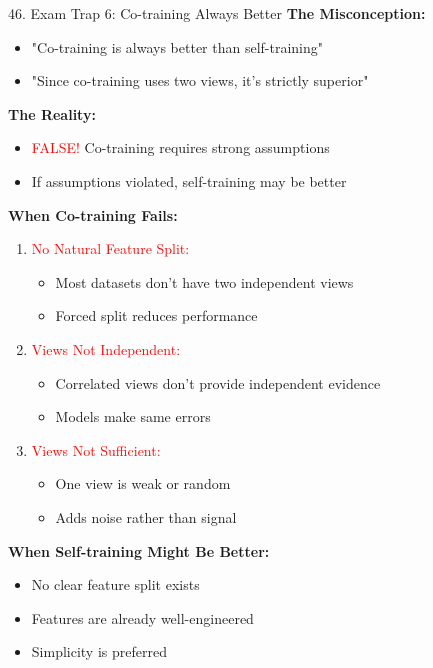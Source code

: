 \documentclass[8pt]{beamer}
\begin{document}
	\begin{frame}{46. Exam Trap 6: Co-training Always Better}
		\fontsize{6.5}{7.5}\selectfont
		\textbf{The Misconception:}
		\begin{itemize}
			\item "Co-training is always better than self-training"
			\item "Since co-training uses two views, it's strictly superior"
		\end{itemize}
		
		\textbf{The Reality:}
		\begin{itemize}
			\item \textcolor{red}{FALSE!} Co-training requires strong assumptions
			\item If assumptions violated, self-training may be better
		\end{itemize}
		
		\textbf{When Co-training Fails:}
		\begin{enumerate}
			\item \textcolor{red}{No Natural Feature Split:}
			\begin{itemize}
				\item Most datasets don't have two independent views
				\item Forced split reduces performance
			\end{itemize}
			
			\item \textcolor{red}{Views Not Independent:}
			\begin{itemize}
				\item Correlated views don't provide independent evidence
				\item Models make same errors
			\end{itemize}
			
			\item \textcolor{red}{Views Not Sufficient:}
			\begin{itemize}
				\item One view is weak or random
				\item Adds noise rather than signal
			\end{itemize}
		\end{enumerate}
		
		\textbf{When Self-training Might Be Better:}
		\begin{itemize}
			\item No clear feature split exists
			\item Features are already well-engineered
			\item Simplicity is preferred
		\end{itemize}
	\end{frame}
	
\end{document}
